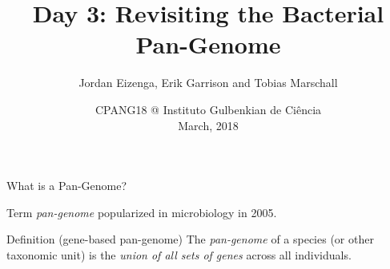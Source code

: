 \documentclass[notes=hide]{beamer}
\title{Day 3: Revisiting the Bacterial Pan-Genome}
\author[TM]{Jordan Eizenga, Erik Garrison and Tobias Marschall}
\date{CPANG18 @ Instituto Gulbenkian de Ci\^{e}ncia\\ March, 2018}
\newcommand{\0}{\ensuremath{\mathtt{0}}}
\newcommand{\1}{\ensuremath{\mathtt{1}}}
\begin{document}
\frame[plain]{\titlepage}



\begin{frame}[label=pangenomics]{What is a Pan-Genome?}
\begin{block}{}
Term \emph{pan-genome} popularized in microbiology in 2005.
\end{block}
\begin{block}{Definition (gene-based pan-genome)}
The \emph{pan-genome} of a species (or other taxonomic unit) is the \emph{union of all sets of genes} across all individuals.
\end{block}
\end{frame}
\end{document}

